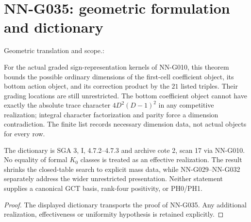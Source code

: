 \section{NN-G035: geometric formulation and dictionary}
\begin{geometricstatement}[NN-G035]
Geometric translation and scope.:

For the actual graded sign-representation kernels of
NN-G010, this theorem bounds the possible ordinary
dimensions of the first-cell coefficient object, its
bottom action object, and its correction product by
the $21$ listed triples. Their grading locations are
still unrestricted. The bottom coefficient object
cannot have exactly the absolute trace character
$4D^2(D-1)^2$ in any competitive realization; integral
character factorization and parity force a dimension
contradiction. The finite list records necessary
dimension data, not actual objects for every row.

The dictionary is SGA 3, I, 4.7.2--4.7.3 and archive
cote 2, scan 17 via NN-G010. No equality of formal
$K_0$ classes is treated as an effective realization.
The result shrinks the closed-table search to explicit
mass data, while NN-G029--NN-G032 separately address
the wider unrestricted presentation. Neither statement
supplies a canonical GCT basis, rank-four positivity,
or PH0/PH1.



\end{geometricstatement}
\begin{proof} The displayed dictionary transports the proof of NN-G035. Any additional realization, effectiveness or uniformity hypothesis is retained explicitly.\end{proof}


